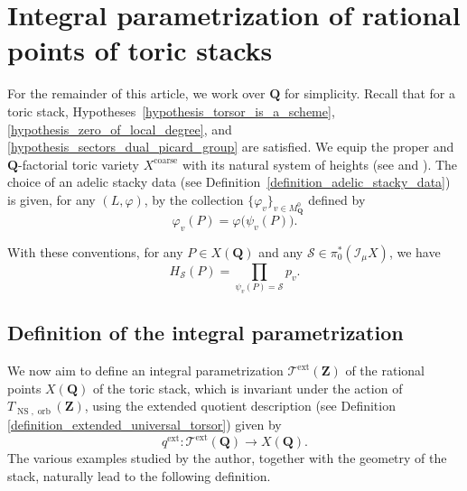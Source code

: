\documentclass{proc-l}
\newcommand{\Z}{\mathbf{Z}}
\newcommand{\N}{\mathbf{N}}
\newcommand{\Q}{\mathbf{Q}}
\DeclareMathOperator{\NS}{NS}
\DeclareMathOperator{\coarse}{coarse}
\DeclareMathOperator{\orb}{orb}
\DeclareMathOperator{\ext}{ext}
\newcommand{\stackS}{\mathcal{S}}
\newcommand{\stackT}{\mathcal{T}}
\newcommand{\sheafI}{\mathcal{I}}
\newcommand{\twistsector}{\pi_0^*(\sheafI_{\mu} X)}
\theoremstyle{definition}
\theoremstyle{remark}
\numberwithin{equation}{section}
\begin{document}
\section{Integral parametrization of rational points of toric stacks }


For the remainder of this article, we work over $\Q$ for simplicity. Recall that for a
toric stack, Hypotheses~\ref{hypothesis_torsor_is_a_scheme},
\ref{hypothesis_zero_of_local_degree}, and
\ref{hypothesis_sectors_dual_picard_group} are satisfied. We equip the proper and $\Q$-factorial toric variety $X^{\coarse}$ with its natural
system of heights (see \cite[Definition~9.2]{salberger_torsor} and
\cite[Proposition~2.1.2]{Batyrev1990}). The choice of an adelic stacky data (see
Definition~\ref{definition_adelic_stacky_data}) is given, for any $(L,\varphi)$, by the
collection $\{\varphi_v\}_{v \in M_{\Q}^0}$ defined by
\[
\varphi_v(P) = \varphi\bigl(\psi_v(P)\bigr).
\]

With these conventions, for any $P \in X(\Q)$ and any $\stackS \in \twistsector$, we have
\[
H_{\stackS}(P)
=
\prod_{\psi_v(P) = \stackS} p_v .
\]








\subsection{Definition of the integral parametrization}

We now aim to define an integral parametrization $\stackT^{\ext}(\Z)$ of the rational points $X(\Q)$ of the toric stack, which is invariant under the action of $T_{\NS,\orb}(\Z)$, using the extended quotient description (see Definition \ref{definition_extended_universal_torsor}) given by
\[
q^{\ext} : \stackT^{\ext}(\Q) \longrightarrow X(\Q).
\]
The various examples studied by the author, together with the geometry of the stack, naturally lead to the following definition.
\end{document}
